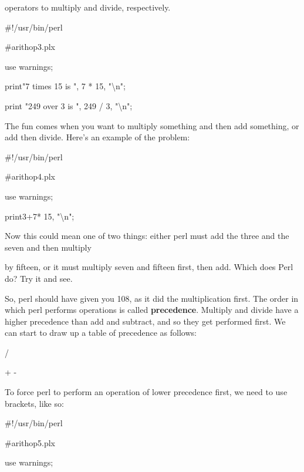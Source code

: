 \documentclass[a4paper,11pt]{book}
\begin{document}
\noindent operators to multiply and divide, respectively.

\noindent 

\noindent 

\noindent \#!/usr/bin/perl

\noindent \#arithop3.plx

\noindent use warnings;

\noindent print"7 times 15 is ", 7 * 15, "\textbackslash n";

\noindent print "249 over 3 is ", 249 / 3, "\textbackslash n";

\noindent 

\noindent The fun comes when you want to multiply something and then add something, or add then divide. Here's an example of the problem:

\noindent 

\noindent \#!/usr/bin/perl

\noindent \#arithop4.plx

\noindent use warnings;

\noindent print3+7* 15, "\textbackslash n";

\noindent 

\noindent Now this could mean one of two things: either perl must add the three and the seven and then multiply

\noindent by fifteen, or it must multiply seven and fifteen first, then add. Which does Perl do? Try it and see.

\noindent 

\noindent So, perl should have given you 108, as it did the multiplication first. The order in which perl performs operations is called \textbf{precedence}. Multiply and divide have a higher precedence than add and subtract, and so they get performed first. We can start to draw up a table of precedence as follows:

\noindent 

\noindent * /

\noindent 

\noindent + -

\noindent 

\noindent To force perl to perform an operation of lower precedence first, we need to use brackets, like so:

\noindent 

\noindent \#!/usr/bin/perl

\noindent \#arithop5.plx

\noindent use warnings;
\end{document}
